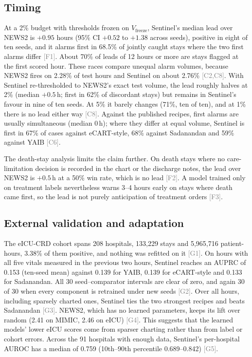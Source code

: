 \documentclass[11pt]{article}
\newcommand{\ev}[1]{\textcolor{gray}{\scriptsize[#1]}}   %
\begin{document}
\subsection{Timing}
At a 2\% budget with thresholds frozen on $V_{\text{freeze}}$, Sentinel's median
lead over NEWS2 is $+0.95$ hours (95\% CI $+0.52$ to $+1.38$ across seeds),
positive in eight of ten seeds, and it alarms first in 68.5\% of jointly caught
stays where the two first alarms differ \ev{F1}. About 70\% of leads of 12 hours
or more are stays flagged at the first scored hour. These races compare unequal
alarm volumes, because NEWS2 fires on 2.28\% of test hours and Sentinel on about
2.76\% \ev{C2,C8}. With Sentinel re-thresholded to NEWS2's exact test volume, the
lead roughly halves at 2\% (median $+0.5$\,h; first in 62\% of discordant stays)
but remains in Sentinel's favour in nine of ten seeds. At 5\% it barely changes
(71\%, ten of ten), and at 1\% there is no lead either way \ev{C8}. Against the
published recipes, first alarms are usually simultaneous (median 0\,h); where
they differ at equal volume, Sentinel is first in 67\% of cases against
eCART-style, 68\% against Sadanandan and 59\% against YAIB \ev{C6}.

The death-stay analysis limits the claim further. On death stays where no
care-limitation decision is recorded in the chart or the discharge notes, the
lead over NEWS2 is $+0.5$\,h at a 50\% win rate, which is no lead \ev{F2}. A model
trained only on treatment labels nevertheless warns 3--4 hours early on stays
where death came first, so the lead is not purely anticipation of treatment
orders \ev{F3}.

\subsection{External validation and adaptation}
The eICU-CRD cohort spans 208 hospitals, 133{,}229 stays and 5{,}965{,}716
patient-hours, 3.38\% of them positive, and nothing was refitted on it \ev{G1}. On hours with
all five vitals measured in the previous two hours, Sentinel reaches an AUPRC of
0.153 (ten-seed mean) against 0.139 for YAIB, 0.139 for eCART-style and 0.133 for
Sadanandan. All 30 seed--comparator intervals are clear of zero, and again 30 of
30 when every component is retrained under new seeds \ev{G2}. Over all hours,
including sparsely charted ones, Sentinel ties the two strongest recipes and
beats Sadanandan \ev{G3}. NEWS2, which has no learned parameters, keeps its lift
over random (2.41 on MIMIC, 2.46 on eICU) \ev{G4}. This suggests that the learned
models' lower eICU scores come from sparser charting rather than from label or
cohort errors. Across the 91 hospitals with enough data, Sentinel's
per-hospital AUROC has a median of 0.759 (10th--90th percentile 0.689--0.842)
\ev{G5}.
\end{document}
